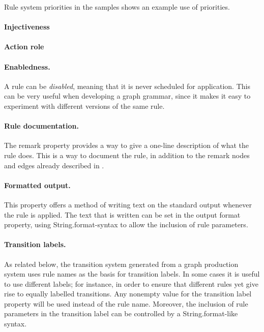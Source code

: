 Rule system \textsf{priorities} in the \GROOVE{} samples shows an example use
of priorities.

\paragraph{Injectiveness}

\paragraph{Action role}

\paragraph{Enabledness.}

A rule can be \emph{disabled}, meaning that it is never scheduled for
application. This can be very useful when developing a graph grammar, since it
makes it easy to experiment with different versions of the same rule.

\paragraph{Rule documentation.}

The \textsf{remark} property provides a way to give a one-line description of
what the rule does. This is a way to document the rule, in addition to the
remark nodes and edges already described in .

\paragraph{Formatted output.}

This property offers a method of writing text on the standard output whenever
the rule is applied. The text that is written can be set in the \textsf{output
format} property, using \textsf{String.format}-syntax to allow the inclusion of
rule parameters.

\paragraph{Transition labels.}

As related below, the transition system generated from a graph production
system uses rule names as the basis for transition labels. In some cases it is
useful to use different labels; for instance, in order to ensure that different
rules yet give rise to equally labelled transitions. Any nonempty value for the
\textsf{transition label} property will be used instead of the rule
name. Moreover, the inclusion of rule parameters in the transition label can be
controlled by a \textsf{String.format}-like syntax.


